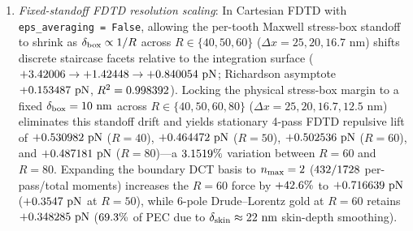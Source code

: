 \documentclass[pdflatex,sn-nature]{sn-jnl}
\begin{document}
\begin{enumerate}
    \item \emph{Fixed-standoff FDTD resolution scaling}: In Cartesian FDTD with \texttt{eps\_averaging = False}, allowing the per-tooth Maxwell stress-box standoff to shrink as $\delta_{\rm box} \propto 1/R$ across $R \in \{40, 50, 60\}$ ($\Delta x = 25, 20, 16.7\text{ nm}$) shifts discrete staircase facets relative to the integration surface ($+3.42006{} \to +1.42448{} \to +0.840054{}\text{ pN}$; Richardson asymptote $+0.153487{}\text{ pN}$, $R^2 = 0.998392{}$). Locking the physical stress-box margin to a fixed $\delta_{\rm box} = 10{}\text{ nm}$ across $R \in \{40, 50, 60, 80\}$ ($\Delta x = 25, 20, 16.7, 12.5\text{ nm}$) eliminates this standoff drift and yields stationary 4-pass FDTD repulsive lift of $+0.530982{}\text{ pN}$ ($R=40$), $+0.464472{}\text{ pN}$ ($R=50$), $+0.502536{}\text{ pN}$ ($R=60$), and $+0.487181{}\text{ pN}$ ($R=80$)---a $3.1519{}\%$ variation between $R=60$ and $R=80$. Expanding the boundary DCT basis to $n_{\rm max}=2$ ($432{}/1728{}$ per-pass/total moments) increases the $R=60$ force by $+42.6{}\%$ to $+0.716639{}\text{ pN}$ ($+0.3547{}\text{ pN}$ at $R=50$), while 6-pole Drude--Lorentz gold at $R=60$ retains $+0.348285{}\text{ pN}$ ($69.3{}\%$ of PEC due to $\delta_{\rm skin} \approx 22\text{ nm}$ skin-depth smoothing).
\end{enumerate}
\end{document}
